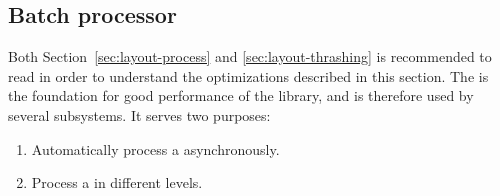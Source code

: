 \documentclass[a4paper,11pt]{kth-mag}
\begin{document}
      \subsection{Batch processor}\label{sec:imp_batch_processor}
        Both Section~\ref{sec:layout-process} and \ref{sec:layout-thrashing} is recommended to read in order to understand the optimizations described in this section.
        The  is the foundation for good performance of the library, and is therefore used by several subsystems.
        It serves two purposes:
        \begin{enumerate}
          \item Automatically process a  asynchronously.
          \item Process a  in different levels.
        \end{enumerate}
        
\end{document}
